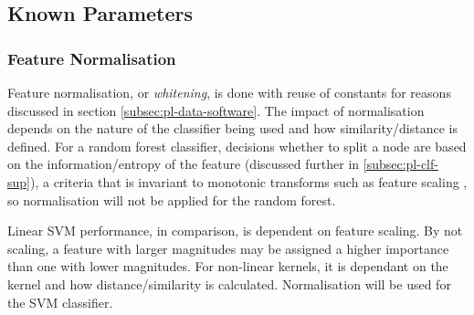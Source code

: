     
        
    \subsection{Known Parameters}
    \label{subsec:exp-clf-known}  
        \subsubsection{Feature Normalisation}
        \label{subsubsec:exp-clf-known-featnorm}
            Feature normalisation, or \textit{whitening}, is done with reuse of constants for reasons discussed in section \ref{subsec:pl-data-software}. The impact of normalisation depends on the nature of the classifier being used and how similarity/distance is defined. For a random forest classifier, decisions whether to split a node are based on the information/entropy of the feature (discussed further in \ref{subsec:pl-clf-sup}), a criteria that is invariant to monotonic transforms such as feature scaling \cite{Hastie2009}, so normalisation will not be applied for the random forest.
            
            Linear SVM performance, in comparison, is dependent on feature scaling. By not scaling, a feature with larger magnitudes may be assigned a higher importance than one with lower magnitudes. For non-linear kernels, it is dependant on the kernel and how distance/similarity is calculated. Normalisation will be used for the SVM classifier.
            
